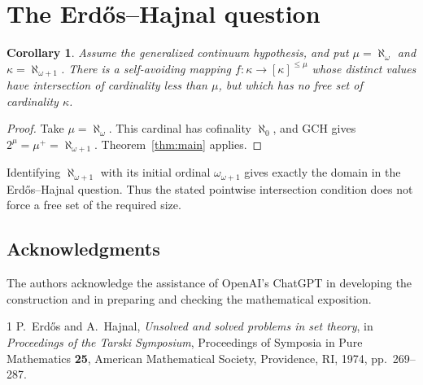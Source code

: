\documentclass[10pt,leqno]{amsart}
\newtheorem{corollary}[theorem]{Corollary}
\numberwithin{equation}{section}
\begin{document}
\section{The Erd\H{o}s--Hajnal question}

\begin{corollary}\label{cor:GCH}
Assume the generalized continuum hypothesis, and put $\mu=\aleph_\omega$
and $\kappa=\aleph_{\omega+1}$. There is a self-avoiding mapping
$f:\kappa\to[\kappa]^{\leq\mu}$ whose distinct values have intersection of
cardinality less than $\mu$, but which has no free set of cardinality $\kappa$.
\end{corollary}

\begin{proof}
Take $\mu=\aleph_\omega$. This cardinal has cofinality $\aleph_0$, and GCH
gives $2^\mu=\mu^+=\aleph_{\omega+1}$. Theorem~\ref{thm:main} applies.\qedhere
\end{proof}

Identifying $\aleph_{\omega+1}$ with its initial ordinal
$\omega_{\omega+1}$ gives exactly the domain in the Erd\H{o}s--Hajnal
question. Thus the stated pointwise intersection condition does not force
a free set of the required size.

\subsection*{Acknowledgments}
The authors acknowledge the assistance of OpenAI's ChatGPT in developing
the construction and in preparing and checking the mathematical exposition.

\begin{thebibliography}{1}
 P.~Erd\H{o}s and A.~Hajnal,
\emph{Unsolved and solved problems in set theory},
in \emph{Proceedings of the Tarski Symposium},
Proceedings of Symposia in Pure Mathematics \textbf{25},
American Mathematical Society, Providence, RI, 1974, pp.~269--287.
\end{thebibliography}
\end{document}

